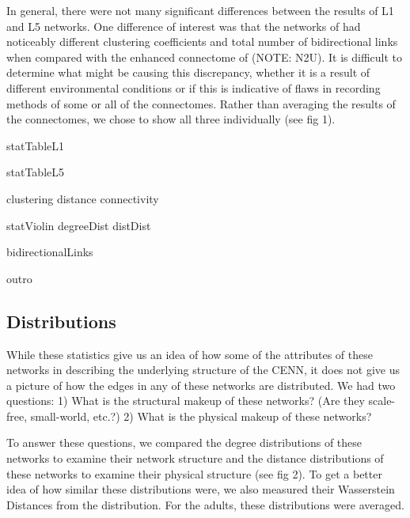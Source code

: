 
In general, there were not many significant differences between the results of L1 and L5 networks. One difference of interest was that the networks of \cite{Witvliet} had noticeably different clustering coefficients and total number of bidirectional links when compared with the enhanced connectome of \cite{White} (NOTE: N2U). 
It is difficult to determine what might be causing this discrepancy, whether it is a result of different environmental conditions or if this is indicative of flaws in recording methods of some or all of the connectomes. Rather than averaging the results of the connectomes, we chose to show all three individually (see fig 1). 

{statTableL1}

{statTableL5}

{clustering} %
{distance}
{connectivity}

{statViolin}
{degreeDist}
{distDist}

{bidirectionalLinks}



{outro}

\subsection{Distributions}

While these statistics give us an idea of how some of the attributes of these networks in describing the underlying structure of the CENN, it does not give us a picture of how the edges in any of these networks are distributed. We had two questions: 
1) What is the structural makeup of these networks? (Are they scale-free, small-world, etc.?) 
2) What is the physical makeup of these networks?

To answer these questions, we compared the degree distributions of these networks to examine their network structure and the distance distributions of these networks to examine their physical structure (see fig 2). 
To get a better idea of how similar these distributions were, we also measured their Wasserstein Distances from the \ce distribution. 
For the adults, these distributions were averaged.

